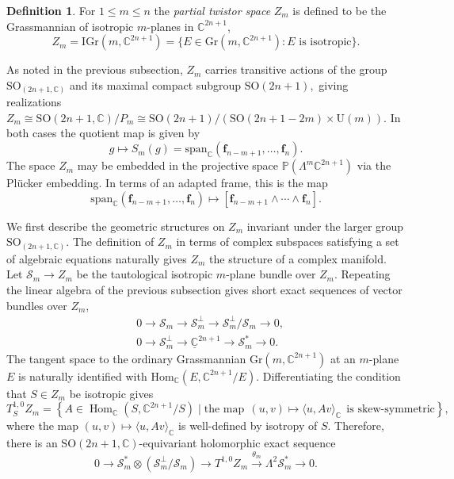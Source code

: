 \documentclass[11pt]{article}
\theoremstyle{definition}
\newtheorem{definition}[theorem]{Definition}
\newcommand{\C}{\mathbb{C}}
\newcommand{\SO}{\mathrm{SO}}
\newcommand{\U}{\mathrm{U}}
\numberwithin{equation}{section}
\begin{document}
\begin{definition}
	For $1 \leq m \leq n$ the \emph{partial twistor space} $Z_m$ is defined to be the Grassmannian of isotropic $m$-planes in $\C^{2n+1}$,
	\begin{equation*}
		Z_m = \mathrm{IGr}(m, \C^{2n+1}) = \{E \in \mathrm{Gr}(m, \C^{2n+1}) \colon E \text{ is isotropic}\}.
	\end{equation*}
\end{definition}
As noted in the previous subsection, $Z_m$ carries transitive actions of the group $\SO_(2n+1, \C)$ and its maximal compact subgroup $\SO(2n+1),$ giving realizations $Z_m \cong \SO(2n+1, \C)/P_m \cong \SO(2n+1)/(\SO(2n+1-2m) \times \U(m)).$ In both cases the quotient map is given by
\begin{equation*}
	g \mapsto S_{m}(g) = \mathrm{span}_\C(\mathbf{f}_{n-m+1}, \ldots, \mathbf{f}_n).
\end{equation*}
The space $Z_m$ may be embedded in the projective space $\mathbb{P}(\Lambda^m \C^{2n+1})$ via the Pl\"ucker embedding. In terms of an adapted frame, this is the map
\begin{equation*}
    \mathrm{span}_\C(\mathbf{f}_{n-m+1}, \ldots, \mathbf{f}_n) \mapsto [\mathbf{f}_{n-m+1} \wedge \cdots \wedge \mathbf{f}_n].
\end{equation*}

We first describe the geometric structures on $Z_m$ invariant under the larger group $\SO_(2n+1,\C).$ The definition of $Z_m$ in terms of complex subspaces satisfying a set of algebraic equations naturally gives $Z_m$ the structure of a complex manifold. Let $\mathcal{S}_m \to Z_m$ be the tautological isotropic $m$-plane bundle over $Z_m.$ Repeating the linear algebra of the previous subsection gives short exact sequences of vector bundles over $Z_m,$
\begin{equation*}
	\begin{aligned}
		  & 0 \to \mathcal{S}_m \to \mathcal{S}_m^{\perp} \to \mathcal{S}_m^{\perp} / \mathcal{S}_m \to 0, \\
		  & 0 \to \mathcal{S}_m^{\perp} \to \underline{\C}^{2n+1} \to \mathcal{S}_m^* \to 0.               
	\end{aligned}
\end{equation*}
The tangent space to the ordinary Grassmannian $\mathrm{Gr}(m,\C^{2n+1})$ at an $m$-plane $E$ is naturally identified with $\mathrm{Hom}_\C(E, \C^{2n+1}/E).$ Differentiating the condition that $S \in Z_m$ be isotropic gives
\begin{equation*}
	T^{1,0}_S Z_m =\left\{A\in\operatorname{Hom}_\C(S,\C^{2n+1}/S) \mid \text{the map} \:\: (u,v) \mapsto \langle u, Av \rangle_\C \:\: \text{is skew-symmetric} \right\},
\end{equation*}
where the map $(u,v) \mapsto \langle u, Av \rangle_\C$ is well-defined by isotropy of $S.$ Therefore, there is an $\SO(2n+1,\C)$-equivariant holomorphic exact sequence
\begin{equation}\label{eq:tangentsesZm}
	0 \longrightarrow \mathcal{S}_m^*\otimes (\mathcal{S}_m^{\perp} / \mathcal{S}_m) \longrightarrow T^{1,0}Z_m \xrightarrow{\theta_m} \Lambda^2 \mathcal{S}_m^* \longrightarrow 0.
\end{equation}
\end{document}
